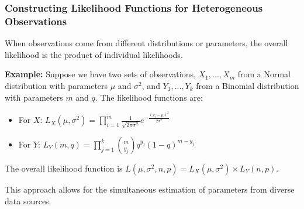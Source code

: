 \documentclass[compress,mathserif]{beamer}
\begin{document}
\begin{frame}
\frametitle{Constructing Likelihood Functions for Heterogeneous Observations}
When observations come from different distributions or parameters, the overall likelihood is the product of individual likelihoods. 

\textbf{Example:}
Suppose we have two sets of observations, $X_1, ..., X_m$ from a Normal distribution with parameters $\mu$ and $\sigma^2$, and $Y_1,...,Y_k$ from a Binomial distribution with parameters $m$ and $q$. The likelihood functions are:
\begin{itemize}
    \item For $X$: $L_X(\mu, \sigma^2) = \prod_{i=1}^{m} \frac{1}{\sqrt{2\pi\sigma^2}} e^{-\frac{(x_i-\mu)^2}{2\sigma^2}}$
    \item For $Y$: $L_Y(m, q) = \prod_{j=1}^{k} {m \choose y_j} q^{y_j} (1-q)^{m-y_j}$
\end{itemize}
The overall likelihood function is $L(\mu, \sigma^2, n, p) = L_X(\mu, \sigma^2) \times L_Y(n, p)$.

This approach allows for the simultaneous estimation of parameters from diverse data sources.
\end{frame}


\end{document}
